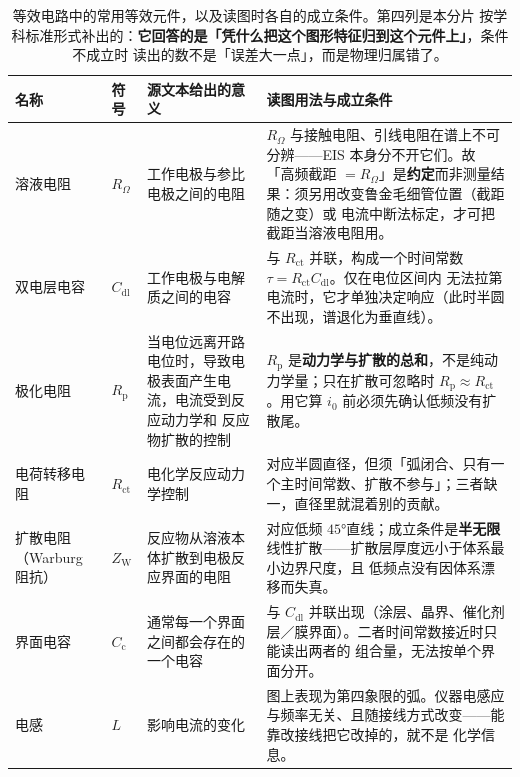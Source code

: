 \begin{table}[htbp]
\centering
\caption{等效电路中的常用等效元件，以及读图时各自的成立条件。第四列是本分片
按学科标准形式补出的：\textbf{它回答的是「凭什么把这个图形特征归到这个元件上」}，条件不成立时
读出的数不是「误差大一点」，而是物理归属错了。}
\label{tab:eis-d-elements}
\begin{tabularx}{\onecolwidth}{@{}p{17mm}p{8mm}p{40mm}X@{}}
\toprule
名称 & 符号 & 源文本给出的意义 & 读图用法与成立条件 \\
\midrule
溶液电阻 & $R_{\Omega}$ & 工作电极与参比电极之间的电阻 &
$R_{\Omega}$ 与接触电阻、引线电阻在谱上不可分辨——EIS 本身分不开它们。故
「高频截距 $=R_{\Omega}$」是\textbf{约定}而非测量结果：须另用改变鲁金毛细管位置（截距随之变）或
电流中断法标定，才可把截距当溶液电阻用。 \\
双电层电容 & $C_{\mathrm{dl}}$ & 工作电极与电解质之间的电容 &
与 $R_{\mathrm{ct}}$ 并联，构成一个时间常数 $\tau=R_{\mathrm{ct}}C_{\mathrm{dl}}$。仅在电位区间内
无法拉第电流时，它才单独决定响应（此时半圆不出现，谱退化为垂直线）。 \\
极化电阻 & $R_{\mathrm{p}}$ & 当电位远离开路电位时，导致电极表面产生电流，电流受到反应动力学和
反应物扩散的控制 &
$R_{\mathrm{p}}$ 是\textbf{动力学与扩散的总和}，不是纯动力学量；只在扩散可忽略时
$R_{\mathrm{p}}\approx R_{\mathrm{ct}}$。用它算 $i_0$ 前必须先确认低频没有扩散尾。 \\
电荷转移电阻 & $R_{\mathrm{ct}}$ & 电化学反应动力学控制 &
对应半圆直径，但须「弧闭合、只有一个主时间常数、扩散不参与」；三者缺一，直径里就混着别的贡献。 \\
扩散电阻（Warburg 阻抗） & $Z_{\mathrm{W}}$ & 反应物从溶液本体扩散到电极反应界面的电阻 &
对应低频 $45$°直线；成立条件是\textbf{半无限}线性扩散——扩散层厚度远小于体系最小边界尺度，且
低频点没有因体系漂移而失真。 \\
界面电容 & $C_{\mathrm{c}}$ & 通常每一个界面之间都会存在的一个电容 &
与 $C_{\mathrm{dl}}$ 并联出现（涂层、晶界、催化剂层／膜界面）。二者时间常数接近时只能读出两者的
组合量，无法按单个界面分开。 \\
电感 & $L$ & 影响电流的变化 &
图上表现为第四象限的弧。仪器电感应与频率无关、且随接线方式改变——能靠改接线把它改掉的，就不是
化学信息。 \\
\bottomrule
\end{tabularx}

\end{table}

